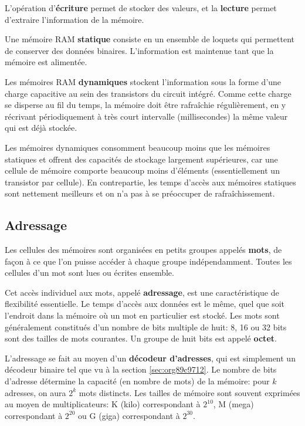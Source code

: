 \documentclass[11pt]{article}
\begin{document}
L'opération d'\textbf{écriture} permet de stocker des valeurs, et la
\textbf{lecture} permet d'extraire l'information de la mémoire.

Une mémoire RAM \textbf{statique} consiste en un ensemble de loquets qui
permettent de conserver des données binaires. L'information est
maintenue tant que la mémoire est alimentée. 

Les mémoires RAM \textbf{dynamiques} stockent l'information sous la forme
d'une charge capacitive au sein des transistors du circuit
intégré. Comme cette charge se disperse au fil du temps, la mémoire
doit être rafraîchie régulièrement, en y récrivant périodiquement à
très court intervalle (millisecondes) la même valeur qui est déjà
stockée.

Les mémoires dynamiques consomment beaucoup moins que les mémoires
statiques et offrent des capacités de stockage largement supérieures,
car une cellule de mémoire comporte beaucoup moins d'éléments
(essentiellement un transistor par cellule). En contrepartie, les
temps d'accès aux mémoires statiques sont nettement meilleurs et on
n'a pas à se préoccuper de rafraîchissement.

\subsection{Adressage}
\label{sec:orgc01ddcb}

Les cellules des mémoires sont organisées en petits groupes appelés
\textbf{mots}, de façon à ce que l'on puisse accéder à chaque groupe
indépendamment. Toutes les cellules d'un mot sont lues ou écrites
ensemble.

Cet accès individuel aux mots, appelé \textbf{adressage}, est une
caractéristique de flexibilité essentielle. Le temps d'accès aux
données est le même, quel que soit l'endroit dans la mémoire où un mot
en particulier est stocké. Les mots sont généralement constitués d'un
nombre de bits multiple de huit: 8, 16 ou 32 bits sont des tailles de
mots courantes. Un groupe de huit bits est appelé \textbf{octet}.

L'adressage se fait au moyen d'un \textbf{décodeur d'adresses}, qui est
simplement un décodeur binaire tel que vu à la section \ref{sec:org89c9712}. Le
nombre de bits d'adresse détermine la capacité (en nombre de mots) de
la mémoire: pour \(k\) adresses, on aura \(2^k\) mots distincts. Les
tailles de mémoire sont souvent exprimées au moyen de multiplicateurs:
K (kilo) correspondant à \(2^{10}\), M (mega) correspondant à \(2^{20}\)
ou G (giga) correspondant à \(2^{30}\).
\end{document}
